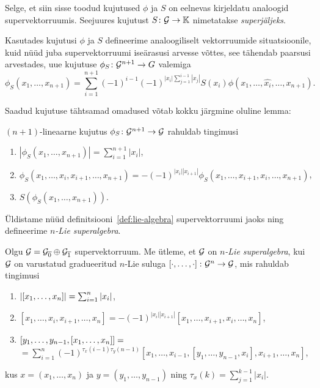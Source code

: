 Selge, et siin sisse toodud kujutused $\phi$ ja $S$ on eelnevas
kirjeldatu analoogid supervektorruumis. Seejuures kujutust $S \colon \mathcal{G} \to \mathbb{K}$
nimetatakse \emph{superjäljeks}.

Kasutades kujutusi $\phi$ ja $S$ defineerime analoogiliselt
vektorruumide situatsioonile, kuid nüüd juba supervektorruumi iseärasusi
arvesse võttes, see tähendab paarsusi arvestades, uue kujutuse
$\phi_S \colon \mathcal{G}^{n+1} \to G$ valemiga
\[
    \phi_S (x_1, \dots, x_{n+1}) =
    \sum_{i=1}^{n+1} (-1)^{i-1}(-1)^{|x_i| \sum_{j=1}^{i-1} |x_j| }
        S(x_i) \phi \left(
            x_1, \dots, \hat{x_i}, \dots, x_{n+1}
        \right).
\]

Saadud kujutuse tähtsamad omadused võtab kokku järgmine oluline lemma:

\begin{lemma}
    $(n+1)$-lineaarne kujutus $\phi_S \colon \mathcal{G}^{n+1} \to \mathcal{G}$
    rahuldab tingimusi
    \begin{enumerate}
        \item $ | \phi_S \left(x_1, \dots, x_{n+1} \right) | =
               \sum_{i=1}^{n+1} |x_i| $,
        \item $ \phi_S \left(x_1, \dots, x_i, x_{i+1}, \dots, x_{n+1} \right) =
               -(-1)^{|x_i| |x_{i+1}|} \phi_S \left(
                    x_1, \dots, x_{i+1}, x_i, \dots, x_{n+1}
                \right) $,
        \item $S \left( \phi_S \left( x_1, \dots, x_{n+1} \right) \right)$.
    \end{enumerate}
\end{lemma}

Üldistame nüüd definitsiooni~\ref{def:lie-algebra} supervektorruumi jaoks
ning defineerime \emph{$n$-Lie superalgebra}.

\begin{dfn}
    Olgu $\mathcal{G} = \mathcal{G}_{\overline{0}} \oplus \mathcal{G}_{\overline{1}}$ 
    supervektorruum. Me ütleme, et $\mathcal{G}$ on
    \emph{$n$-Lie superalgebra}, kui $\mathcal{G}$ on varustatud
    gradueeritud $n$-Lie suluga $\left[ \cdot, \dots, \cdot \right] \colon \mathcal{G}^n \to \mathcal{G}$,
    mis rahuldab tingimusi
    \begin{enumerate}
        \item $\left| \left[ x_1, \dots, x_n \right] \right| = \sum_{i=1}^n |x_i| $,
        \item $\left[ x_1, \dots, x_i, x_{i+1}, \dots, x_n \right] =
            -(-1)^{|x_i| |x_{i+1}|} \left[
                x_1, \dots, x_{i+1}, x_i, \dots, x_n
            \right]$,
        \item $\left[ y_1, \dots, y_{n-1}, \left[ x_1, \dots, x_n \right] \right] = $ \\
            $ = \sum_{i=1}^n (-1)^{\tau_x (i-1) \tau_y (n-1)}
            \left[
                x_1, \dots, x_{i-1},
                \left[ y_1, \dots, y_{n-1}, x_i \right],
                x_{i+1}, \dots, x_n
            \right] $,
    \end{enumerate}
    kus $x = (x_1, \dots, x_n)$ ja $y = (y_1, \dots, y_{n-1})$ ning
    $\tau_x (k) = \sum_{j=1}^{k-1} |x_i|$.
\end{dfn}


